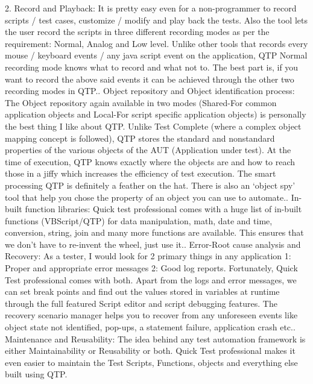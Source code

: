 2. Record and Playback: It is pretty easy even for a non-programmer to record scripts / test cases, customize / modify and play back the tests. Also the tool lets the user record the scripts in three different recording modes as per the requirement: Normal, Analog and Low level. Unlike other tools that records every mouse / keyboard events / any java script event on the application, QTP Normal recording mode knows what to record and what not to. The best part is, if you want to record the above said events it can be achieved through the other two recording modes in QTP.. Object repository and Object identification process: The Object repository again available in two modes (Shared-For common application objects and Local-For script specific application objects) is personally the best thing I like about QTP. Unlike Test Complete (where a complex object mapping concept is followed), QTP stores the standard and nonstandard properties of the various objects of the AUT (Application under test). At the time of execution, QTP knows exactly where the objects are and how to reach those in a jiffy which increases the efficiency of test execution. The smart processing QTP is definitely a feather on the hat. There is also an ‘object spy’ tool that help you chose the property of an object you can use to automate.. In-built function libraries: Quick test professional comes with a huge list of in-built functions (VBScript/QTP) for data manipulation, math, date and time, conversion, string, join and many more functions are available. This ensures that we don’t have to re-invent the wheel, just use it.. Error-Root cause analysis and Recovery: As a tester, I would look for 2 primary things in any application 1: Proper and appropriate error messages 2: Good log reports. Fortunately, Quick Test professional comes with both. Apart from the logs and error messages, we can set break points and find out the values stored in variables at runtime through the full featured Script editor and script debugging features. The recovery scenario manager helps you to recover from any unforeseen events like object state not identified, pop-ups, a statement failure, application crash etc.. Maintenance and Reusability: The idea behind any test automation framework is either Maintainability or Reusability or both. Quick Test professional makes it even easier to maintain the Test Scripts, Functions, objects and everything else built using QTP.\newline

